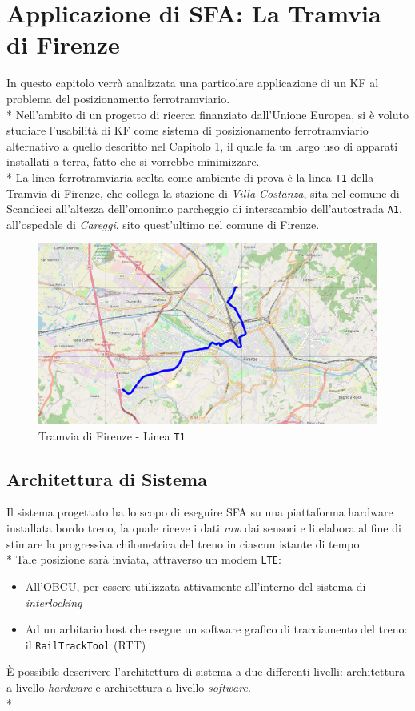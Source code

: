\chapter{Applicazione di SFA: La Tramvia di Firenze}
In questo capitolo verr\`a analizzata una particolare applicazione di un KF al problema del posizionamento ferrotramviario.\\*
Nell'ambito di un progetto di ricerca finanziato dall'Unione Europea, si \`e voluto studiare l'usabilit\`a di KF come sistema di posizionamento ferrotramviario alternativo a quello descritto nel Capitolo 1, il quale fa un largo uso di apparati installati a terra, fatto che si vorrebbe minimizzare.\\*
La linea ferrotramviaria scelta come ambiente di prova \`e la linea \texttt{T1} della Tramvia di Firenze, che collega la stazione di \emph{Villa Costanza}, sita nel comune di Scandicci all'altezza dell'omonimo parcheggio di interscambio dell'autostrada \texttt{A1}, all'ospedale di \emph{Careggi}, sito quest'ultimo nel comune di Firenze.
\begin{figure}[h]
	\centering
	\includegraphics[width=\linewidth]{img/t1}
	\caption{Tramvia di Firenze - Linea \texttt{T1}}
	\label{fig:t1}
\end{figure}
\section{Architettura di Sistema}
Il sistema progettato ha lo scopo di eseguire SFA su una piattaforma hardware installata bordo treno, la quale riceve i dati \emph{raw} dai sensori e li elabora al fine di stimare la progressiva chilometrica del treno in ciascun istante di tempo.\\*
Tale posizione sar\`a inviata, attraverso un modem \texttt{LTE}:
\begin{itemize}
	\item All'OBCU, per essere utilizzata attivamente all'interno del sistema di \emph{interlocking}
	\item Ad un arbitario host che esegue un software grafico di tracciamento del treno: il \texttt{RailTrackTool} (RTT)
\end{itemize}
\`E possibile descrivere l'architettura di sistema a due differenti livelli: architettura a livello \emph{hardware} e architettura a livello \emph{software}.\\*
